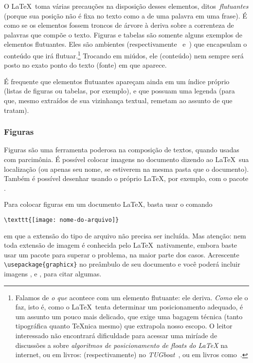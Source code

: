 O \LaTeX\ toma várias precauções na disposição desses elementos,
ditos~\emph{flutuantes} (porque sua posição não é fixa no texto como a
de uma palavra em uma frase). É como se os elementos fossem troncos de
árvore à deriva sobre a correnteza de palavras que compõe o texto.
Figuras e tabelas são somente alguns exemplos de elementos
flutuantes. Eles são ambientes (respectivamente~
e~) que encapsulam o conteúdo que irá
flutuar.\footnote{Falamos de \emph{o que} acontece com um elemento
  flutuante: ele deriva. \emph{Como} ele o faz, isto é, como o
  \LaTeX\ tenta determinar um posicionamento adequado, é um assunto um
  pouco mais delicado, que exige uma bagagem técnica (tanto
  tipográfica quanto \TeX nica mesmo) que extrapola nosso escopo. O leitor
  interessado não encontrará dificuldade para acessar uma miríade de
  discussões a sobre \emph{algoritmos de posicionamento de
    \emph{floats} do \LaTeX} na internet, ou em
  livros: (respectivamente) no
  \emph{TUGboat}~\cite{float-positioning-tug-proc-2000}, ou em livros
  como~\cite{companion}.} Trocando em miúdos, ele (conteúdo) nem
sempre será posto no exato ponto do texto (fonte) em que aparece.

É frequente que elementos flutuantes apareçam ainda em um índice
próprio (listas de figuras ou tabelas, por exemplo), e que possuam uma
legenda (para que, mesmo extraídos de sua vizinhança textual,
remetam ao assunto de que tratam).


\subsubsection{Figuras}

Figuras são uma ferramenta poderosa na composição de textos, quando
usadas com parcimônia. É possível colocar imagens no documento dizendo
ao \LaTeX\ sua localização (ou apenas seu nome, se estiverem na mesma
pasta que o documento). Também é possível desenhar usando o próprio
\LaTeX, por exemplo, com o pacote .

Para colocar figuras em um documento \LaTeX, basta usar o comando
\begin{center}
\verb!\texttt{[image: nome-do-arquivo]}!
\end{center}
em que a extensão do tipo de arquivo não precisa ser incluída. Mas
atenção: nem toda extensão de imagem é conhecida pelo
\LaTeX\ nativamente, embora baste usar um pacote para superar o
problema, na maior parte dos casos. Acrescente
\verb!\usepackage{graphicx}! no preâmbulo de seu documento e você
poderá incluir imagens ,  e
, para citar algumas.

